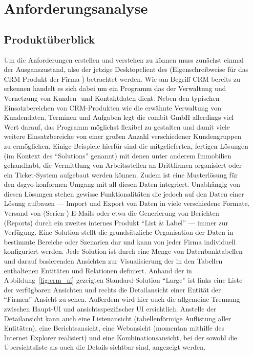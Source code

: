 \chapter{Anforderungsanalyse}\label{chap:requirements}

\section{Produktüberblick}
Um die Anforderungen erstellen und verstehen zu können muss zunächst einmal der Ausganszustand, also der jetzige Desktopclient des  (Eigenschreibweise für das \gls{CRM} Produkt der Firma ) betrachtet werden. Wie am Begriff \gls{CRM} bereits zu erkennen handelt es sich dabei um ein Programm das der Verwaltung und Vernetzung von Kunden- und Kontaktdaten dient. Neben den typischen Einsatzbereichen von \gls{CRM}-Produkten wie die erwähnte Verwaltung von Kundendaten, Terminen und Aufgaben legt die combit GmbH allerdings viel Wert darauf, das Programm möglichst flexibel zu gestalten und damit viele weitere Einsatzbereiche von einer großen Anzahl verschiedener Kundengruppen zu ermöglichen. Einige Beispiele hierfür sind die mitgelieferten, fertigen Lösungen (im Kontext des  ``Solutions'' genannt) mit denen unter anderem Immobilien gehandhabt, die Vermittlung von Arbeitsstellen an Drittfirmen organisiert oder ein Ticket-System aufgebaut werden können. Zudem ist eine Musterlösung für den \gls{dsgvo}-konformen Umgang mit all diesen Daten integriert. Unabhängig von diesen Lösungen stehen gewisse Funktionalitäten die jedoch auf den Daten einer Lösung aufbauen --- Import und Export von Daten in viele verschiedene Formate, Versand von (Serien-) E-Mails oder etwa die Generierung von Berichten (Reports) durch ein zweites internes Produkt ``List \& Label'' --- immer zur Verfügung.
Eine Solution stellt die grundsätzliche Organisation der Daten in bestimmte Bereiche oder Szenarien dar und kann von jeder Firma individuell konfiguriert werden. Jede Solution ist durch eine Menge von Datenbanktabellen und darauf basierenden Ansichten zur Visualisierung der in den Tabellen enthaltenen Entitäten und Relationen definiert. Anhand der in Abbildung~\ref{fig:crm_ui} gezeigten Standard-Solution  ``Large''  ist links eine Liste der verfügbaren Ansichten und rechts die Detailansicht einer Entität der ``Firmen''-Ansicht zu sehen. Außerdem wird hier auch die allgemeine Trennung zwischen Haupt-UI und ansichtsspezifischer UI ersichtlich. Anstelle der Detailansicht kann auch eine Listenansicht (tabellenförmige Auflistung aller Entitäten), eine Berichtsansicht, eine Webansicht (momentan mithilfe des Internet Explorer realisiert) und eine Kombinationsansicht, bei der sowohl die Übersichtsliste als auch die Details sichtbar sind, angezeigt werden.

